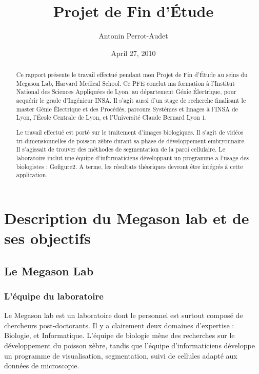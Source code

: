 




\title{Projet de Fin d'Étude}   %
\author{Antonin Perrot-Audet}         %
\date{April 27, 2010}    %
\maketitle

\begin{abstract}
  Ce rapport présente le travail effectué pendant mon Projet de Fin d'Étude au seins du Megason Lab, Harvard Medical School. Ce PFE conclut ma formation à l'Institut National des Sciences Appliquées de Lyon, au département Génie Électrique, pour acquérir le grade d'Ingénieur INSA. Il s'agit aussi d'un stage de recherche finalisant le master Génie Électrique et des Procédés, parcours Systèmes et Images à l'INSA de Lyon, l'École Centrale de Lyon, et l'Université Claude Bernard Lyon 1.
  
  Le travail effectué est porté sur le traitement d'images biologiques. Il s'agit de vidéos tri-dimensionnelles de poisson zèbre durant sa phase de développement embryonnaire. Il s'agissait de trouver des méthodes de segmentation de la paroi cellulaire. Le laboratoire inclut une équipe d'informaticiens développant un programme a l'usage des biologistes : Gofigure2\cite{refGofigure2}. A terme, les résultats théoriques devront être intégrés à cette application.
  
  
\tableofcontents  
  
 
\end{abstract}



\chapter{Description du Megason lab et de ses objectifs} 

\section{Le Megason Lab}

\subsection{L'équipe du laboratoire}
Le Megason lab est un laboratoire dont le personnel est surtout composé de chercheurs post-doctorants.
Il y a clairement deux domaines d'expertise : Biologie, et Informatique.
L'équipe de biologie mène des recherches sur le développement du poisson zèbre,
tandis que l'équipe d'informaticiens développe un programme de visualisation,
segmentation, suivi de cellules adapté aux données de microscopie.

